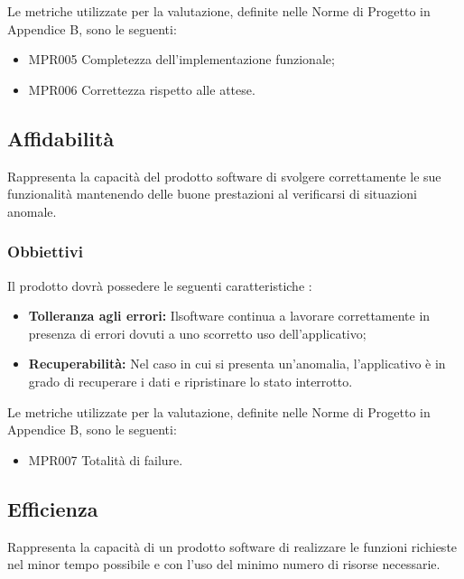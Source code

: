 Le metriche utilizzate per la valutazione, definite nelle Norme di Progetto in Appendice B, sono le seguenti:
\begin{itemize}
	\item MPR005 Completezza dell'implementazione funzionale;
	\item MPR006 Correttezza rispetto alle attese.
\end{itemize}

\subsection{Affidabilità}
Rappresenta la capacità del prodotto software di svolgere correttamente le sue funzionalità mantenendo delle buone prestazioni al verificarsi di situazioni anomale.

\subsubsection{Obbiettivi} Il prodotto dovrà possedere le seguenti caratteristiche :
\begin{itemize}
	\item \textbf{Tolleranza agli errori:} Ilsoftware continua a lavorare correttamente in presenza di errori dovuti a uno scorretto uso dell'applicativo;
	\item \textbf{Recuperabilità:} Nel caso in cui si presenta un'anomalia, l'applicativo è in grado di recuperare i dati e ripristinare lo stato interrotto.
\end{itemize}

Le metriche utilizzate per la valutazione, definite nelle Norme di Progetto in Appendice B, sono le seguenti:
\begin{itemize}
	\item MPR007 Totalità di failure.
\end{itemize}


\subsection{Efficienza}
Rappresenta la capacità di un prodotto software di realizzare le funzioni richieste nel minor tempo possibile e con l'uso del minimo numero di risorse necessarie. 
